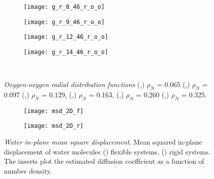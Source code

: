 \documentclass[12pt]{article}
\begin{document}
\begin{figure}[htbp!]
  \begin{subfigure}[b]{0.15\textwidth}
    \texttt{[image: g\_r\_8\_46\_r\_o\_o]}
    \vspace{-15pt} \caption{}
    \label{fig:rg_8_r}
  \end{subfigure}
   \begin{subfigure}[b]{0.15\textwidth}
  \texttt{[image: g\_r\_9\_46\_r\_o\_o]}
    \vspace{-15pt} \caption{}
    \label{fig:rg_9_r}
  \end{subfigure}
  \begin{subfigure}[b]{0.15\textwidth}
    \texttt{[image: g\_r\_12\_46\_r\_o\_o]}
     \vspace{-15pt} \caption{}
    \label{fig:rg_12_r}
  \end{subfigure}
  \begin{subfigure}[b]{0.15\textwidth}
    \texttt{[image: g\_r\_14\_46\_r\_o\_o]}
    \vspace{-15pt} \caption{}
    \label{fig:rg_14_r}
  \end{subfigure}\\
  \caption{\textit{Oxygen-oxygen radial distribution functions} (\protect{},\protect{})  \(\rho_N\) = 0.065 (\protect{},\protect{}) \(\rho_N\) = 0.097 (\protect{},\protect{}) \(\rho_N\) = 0.129, (\protect{},\protect{}) \(\rho_N\) = 0.163, (\protect{},\protect{}) \(\rho_N\) = 0.260 (\protect{},\protect{}) \(\rho_N\) = 0.325.}
  \label{fig:gr}
\end{figure}

\begin{figure}[h!]
	\centering
	\begin{subfigure}[b]{0.49\textwidth}
    \texttt{[image: msd\_2D\_f]}
     \vspace{-15pt} \caption{}
    \label{fig:msd_f}
  \end{subfigure}
  \begin{subfigure}[b]{0.49\textwidth}
    \texttt{[image: msd\_2D\_r]}
     \vspace{-15pt} \caption{}
    \label{fig:msd_r}
  \end{subfigure}
	\caption{\textit{Water in-plane mean square displacement}. Mean squared in-plane displacement of water molecules (\protect{}) flexible systems, (\protect{}) rigid systems. The inserts plot the estimated diffusion coefficient as a function of number density.}
	\label{fig:msd_both}
\end{figure}
\end{document}
